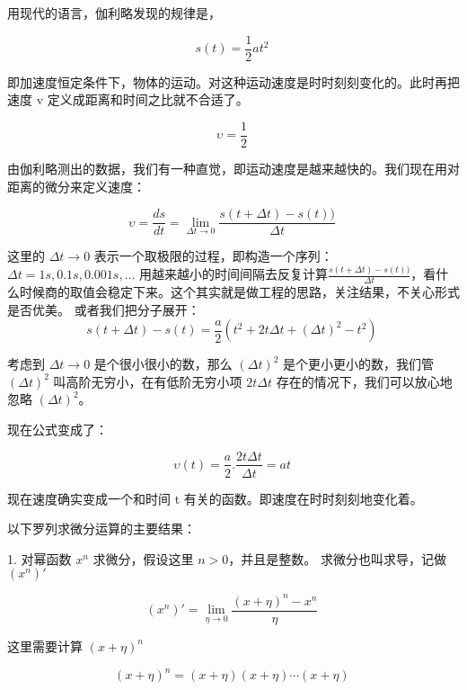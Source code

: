 用现代的语⾔，伽利略发现的规律是，

\begin{equation}
s(t)=\frac{1}{2}at^2~
\end{equation}

即加速度恒定条件下，物体的运动。对这种运动速度是时时刻刻变化的。此时再把速度 v 定义成距离和时间之比就不合适了。

\begin{equation}
\upsilon=\frac{1}{2}~
\end{equation}

由伽利略测出的数据，我们有⼀种直觉，即运动速度是越来越快的。我们现在用对距离的微分来定义速度：

\begin{equation}
\upsilon=\frac{ds}{dt}=\lim_{\Delta t \to 0}\frac{s(t+\Delta t)-s(t))}{\Delta t}~
\end{equation}

这里的 $\Delta t \to 0$ 表示⼀个取极限的过程，即构造⼀个序列：$\Delta t= 1s, 0.1s, 0.001s, ...$ 用越来越小的时间间隔去反复计算$ \frac{s(t+\Delta t)-s(t))}{\Delta t}$，看什么时候商的取值会稳定下来。这个其实就是做⼯程的思路，关注结果，不关⼼形式是否优美。
或者我们把分⼦展开：
\begin{equation}
s(t+\Delta t)-s(t)=\frac{a}{2}\left( t^2+2t\Delta t+(\Delta t)^2-t^2\right)~
\end{equation}

考虑到 $\Delta t \to 0$ 是个很小很小的数，那么 $(\Delta t)^2$ 是个更小更小的数，我们管$(\Delta t)^2$ 叫⾼阶⽆穷小，在有低阶⽆穷小项 $2t\Delta t$ 存在的情况下，我们可以放⼼地忽略 $(\Delta t)^2$。

现在公式变成了：

\begin{equation}
\upsilon \left(t \right)= \frac{a}{2}.\frac{2t\Delta t}{\Delta t}= a t ~
\end{equation}

现在速度确实变成⼀个和时间 t 有关的函数。即速度在时时刻刻地变化着。

以下罗列求微分运算的主要结果：

1. 对幂函数 $x^n$ 求微分，假设这里 $n > 0$，并且是整数。
   求微分也叫求导，记做 $(x^n)'$

\begin{equation}
(x^n)' = \lim_{\eta \to 0} \frac{(x + \eta)^n - x^n}{\eta} \tag{38}~
\end{equation}

这里需要计算 $(x + \eta)^n$

\begin{equation}
(x + \eta)^n = (x + \eta)(x + \eta) \cdots (x + \eta)~
\end{equation}

